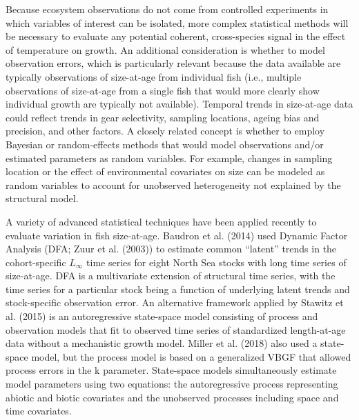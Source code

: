 \documentclass[
]{article}
\begin{document}
Because ecosystem observations do not come from controlled experiments
in which variables of interest can be isolated, more complex statistical
methods will be necessary to evaluate any potential coherent,
cross-species signal in the effect of temperature on growth. An
additional consideration is whether to model observation errors, which
is particularly relevant because the data available are typically
observations of size-at-age from individual fish (i.e., multiple
observations of size-at-age from a single fish that would more clearly
show individual growth are typically not available). Temporal trends in
size-at-age data could reflect trends in gear selectivity, sampling
locations, ageing bias and precision, and other factors. A closely
related concept is whether to employ Bayesian or random-effects methods
that would model observations and/or estimated parameters as random
variables. For example, changes in sampling location or the effect of
environmental covariates on size can be modeled as random variables to
account for unobserved heterogeneity not explained by the structural
model.

A variety of advanced statistical techniques have been applied recently
to evaluate variation in fish size-at-age. Baudron et al. (2014) used
Dynamic Factor Analysis (DFA; Zuur et al. (2003)) to estimate common
``latent'' trends in the cohort-specific \(L_\infty\) time series for
eight North Sea stocks with long time series of size-at-age. DFA is a
multivariate extension of structural time series, with the time series
for a particular stock being a function of underlying latent trends and
stock-specific observation error. An alternative framework applied by
Stawitz et al. (2015) is an autoregressive state-space model consisting
of process and observation models that fit to observed time series of
standardized length-at-age data without a mechanistic growth model.
Miller et al. (2018) also used a state-space model, but the process
model is based on a generalized VBGF that allowed process errors in the
k parameter. State-space models simultaneously estimate model parameters
using two equations: the autoregressive process representing abiotic and
biotic covariates and the unobserved processes including space and time
covariates.
\end{document}

